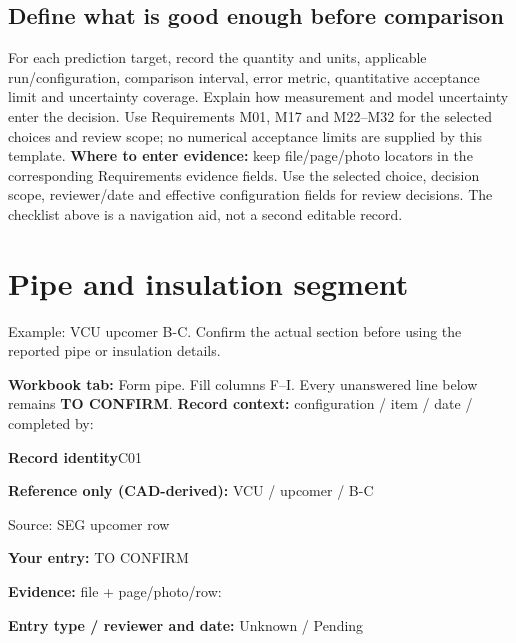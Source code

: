 \documentclass[11pt]{article}
\begin{document}
\subsection*{Define what is good enough before comparison}
For each prediction target, record the quantity and units, applicable run/configuration, comparison interval, error metric, quantitative acceptance limit and uncertainty coverage. Explain how measurement and model uncertainty enter the decision. Use Requirements M01, M17 and M22--M32 for the selected choices and review scope; no numerical acceptance limits are supplied by this template.
\textbf{Where to enter evidence:} keep file/page/photo locators in the corresponding Requirements evidence fields. Use the selected choice, decision scope, reviewer/date and effective configuration fields for review decisions. The checklist above is a navigation aid, not a second editable record.
\par\endgroup
\clearpage\section{Pipe and insulation segment}\label{form-pipe}
Example: VCU upcomer B-C. Confirm the actual section before using the reported pipe or insulation details.
\par\textbf{Workbook tab:} Form pipe. Fill columns F--I. Every unanswered line below remains \textbf{TO CONFIRM}.
\textbf{Record context:} configuration / item / date / completed by: \hrulefill\par
\par\noindent\begin{minipage}{\textwidth}\small
{\color{navy}\bfseries Record identity}\hfill C01\par
\colorbox{pale}{\parbox{\dimexpr\linewidth-2\fboxsep\relax}{
\textbf{Reference only (CAD-derived):} VCU / upcomer / B-C\par
{\footnotesize Source: SEG upcomer row}}}\par
\textbf{Your entry:} {\color{muted}TO CONFIRM}\enspace\hrulefill\par
{\footnotesize\textbf{Evidence:} file + page/photo/row: \hrulefill\par
\textbf{Entry type / reviewer and date:} Unknown / Pending\par
}\end{minipage}\par\vspace{5pt}
\end{document}
